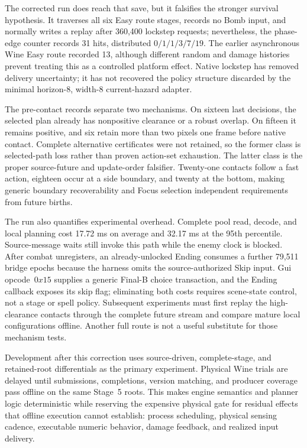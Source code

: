 \documentclass[10pt]{article}
\begin{document}
The corrected run does reach that save, but it falsifies the stronger survival
hypothesis.  It traverses all six Easy route stages, records no Bomb input, and
normally writes a replay after 360,400 lockstep requests; nevertheless, the
phase-edge counter records 31 hits, distributed $0/1/1/3/7/19$.  The earlier
asynchronous Wine Easy route recorded 13, although different random and damage
histories prevent treating this as a controlled platform effect.  Native
lockstep has removed delivery uncertainty; it has not recovered the policy
structure discarded by the minimal horizon-8, width-8 current-hazard adapter.

The pre-contact records separate two mechanisms.  On sixteen last decisions,
the selected plan already has nonpositive clearance or a robust overlap.  On
fifteen it remains positive, and six retain more than two pixels one frame
before native contact.  Complete alternative certificates were not retained,
so the former class is selected-path loss rather than proven action-set
exhaustion.  The latter class is the proper source-future and update-order
falsifier.  Twenty-one contacts follow a fast action, eighteen occur at a side
boundary, and twenty at the bottom, making generic boundary recoverability and
Focus selection independent requirements from future births.

The run also quantifies experimental overhead.  Complete pool read, decode,
and local planning cost 17.72 ms on average and 32.17 ms at the 95th
percentile.  Source-message waits still invoke this path while the enemy clock
is blocked.  After combat unregisters, an already-unlocked Ending consumes a
further 79,511 bridge epochs because the harness omits the source-authorized
Skip input.  Gui opcode~$0x15$ supplies a generic Final-B choice transaction,
and the Ending callback exposes its skip flag; eliminating both costs requires
scene-state control, not a stage or spell policy.  Subsequent experiments must
first replay the high-clearance contacts through the complete future stream
and compare mature local configurations offline.  Another full route is not a
useful substitute for those mechanism tests.

Development after this correction uses source-driven, complete-stage, and
retained-root differentials as the primary experiment.  Physical Wine trials
are delayed until submissions, completions, version matching, and producer
coverage pass offline on the same Stage~5 roots.  This makes engine semantics
and planner logic deterministic while reserving the expensive physical gate
for residual effects that offline execution cannot establish: process
scheduling, physical sensing cadence, executable numeric behavior, damage
feedback, and realized input delivery.
\end{document}
